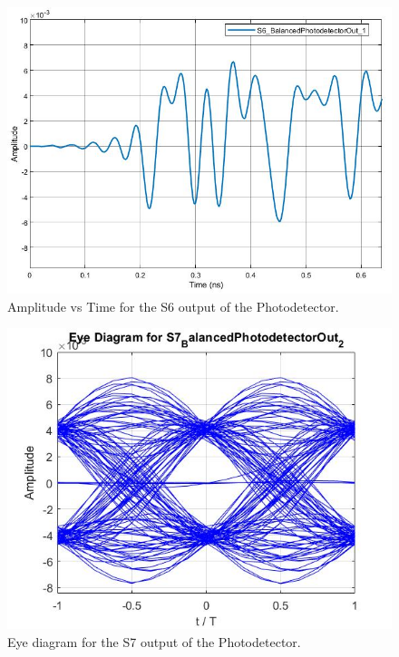 \begin{figure}[h]
	\centering
	\includegraphics[width=\textwidth]{./lib/photodiode/figures/S6_BalancedPhotodetectorOut_1_time}
	\caption{Amplitude vs Time for the S6 output of the Photodetector.}
\end{figure}

\begin{figure}[h]
	\centering
	\includegraphics[width=\textwidth]{./lib/photodiode/figures/S7_BalancedPhotodetectorOut_2_EyeDiagram}
	\caption{Eye diagram for the S7 output of the Photodetector.}
\end{figure}

